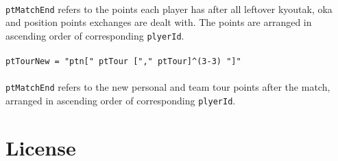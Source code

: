 \documentclass[%
	a4paper%
	,10pt%
	,twoside%
	,notitlepage%
]{article}%
\newcommand*{\ruleSymbol}{\textjapanese{⚠}}%
\newcommand*{\ruleMargin}{\marginpar{\flushright{}\ruleSymbol{}}}%
\newcommand*{\rulePar}{\paragraph*{\ruleMargin{}}}%
\begin{document}
		\paragraph*{}\lstinline/ptMatchEnd/ refers to the points each player has after all leftover kyoutak, oka and position points exchanges are dealt with. The points are arranged in ascending order of corresponding \lstinline/plyerId/. %
		\rulePar{}\lstinline/ptTourNew = "ptn[" ptTour ["," ptTour]^(3-3) "]"/%
		\paragraph*{}\lstinline/ptMatchEnd/ refers to the new personal and team tour points after the match, arranged in ascending order of corresponding \lstinline/plyerId/. %
\appendix{}%
\clearpage{}%
\lstset{%
	deleteindex=[1][keywords]%
}%
\section{License}\label{sec:license}%
% 
\end{document}
